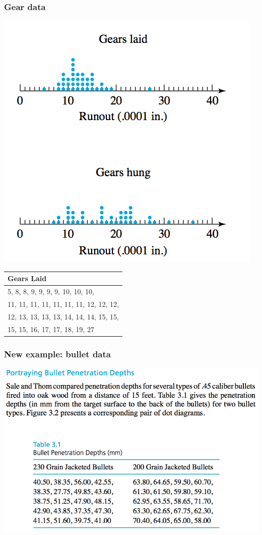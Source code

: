 \documentclass[handout]{beamer}
\numberwithin{equation}{section}
\begin{document}
\begin{frame}
\frametitle{Gear data}
\begin{center}
 \includegraphics{../../fig/geardot.png}
\end{center}
\end{frame}

\begin{frame}[t]
\begin{tabular}{l}
\hline
Gears Laid\\ \hline
5, 8, 8, 9, 9, 9, 9, 10, 10, 10,\\
11, 11, 11, 11, 11, 11, 11, 12, 12, 12,\\
12, 13, 13, 13, 13, 14, 14, 14, 15, 15,\\
15, 15, 16, 17, 17, 18, 19, 27\\\hline
\end{tabular}
\end{frame}

\begin{frame}
\frametitle{New example: bullet data}
\begin{center}
 \includegraphics{../../fig/bulletdata.png}
\end{center}
\end{frame}
\end{document}
